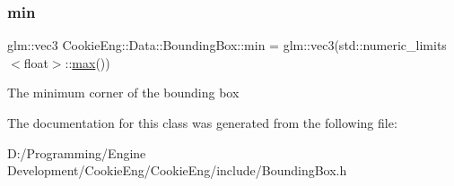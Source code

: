 \subsubsection{\texorpdfstring{min}{min}}
{\footnotesize\ttfamily glm\+::vec3 Cookie\+Eng\+::\+Data\+::\+Bounding\+Box\+::min = glm\+::vec3(std\+::numeric\+\_\+limits$<$float$>$\+::\hyperlink{class_cookie_eng_1_1_data_1_1_bounding_box_a67a8ab24fefc25d92bd154273ee72e95}{max}())}

The minimum corner of the bounding box 

The documentation for this class was generated from the following file\+:\begin{DoxyCompactItemize}
\item 
D\+:/\+Programming/\+Engine Development/\+Cookie\+Eng/\+Cookie\+Eng/include/Bounding\+Box.\+h\end{DoxyCompactItemize}
